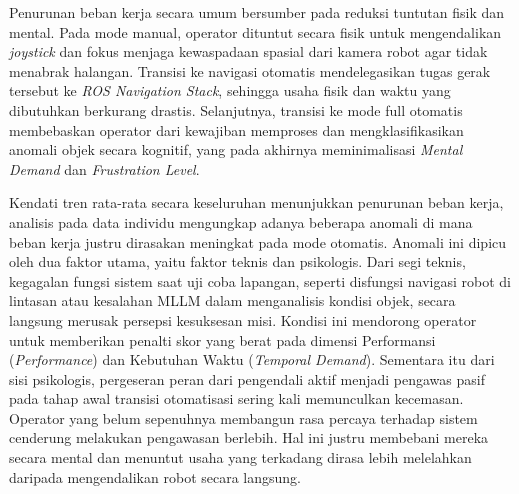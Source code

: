 Penurunan beban kerja secara umum bersumber pada reduksi tuntutan fisik dan mental. Pada mode manual, operator dituntut secara fisik untuk mengendalikan \textit{joystick} dan fokus menjaga kewaspadaan spasial dari kamera robot agar tidak menabrak halangan. Transisi ke navigasi otomatis mendelegasikan tugas gerak tersebut ke \textit{ROS Navigation Stack}, sehingga usaha fisik dan waktu yang dibutuhkan berkurang drastis. Selanjutnya, transisi ke mode full otomatis membebaskan operator dari kewajiban memproses dan mengklasifikasikan anomali objek secara kognitif, yang pada akhirnya meminimalisasi \textit{Mental Demand} dan \textit{Frustration Level}.

Kendati tren rata-rata secara keseluruhan menunjukkan penurunan beban kerja, analisis pada data individu mengungkap adanya beberapa anomali di mana beban kerja justru dirasakan meningkat pada mode otomatis. Anomali ini dipicu oleh dua faktor utama, yaitu faktor teknis dan psikologis. Dari segi teknis, kegagalan fungsi sistem saat uji coba lapangan, seperti disfungsi navigasi robot di lintasan atau kesalahan MLLM dalam menganalisis kondisi objek, secara langsung merusak persepsi kesuksesan misi. Kondisi ini mendorong operator untuk memberikan penalti skor yang berat pada dimensi Performansi (\textit{Performance}) dan Kebutuhan Waktu (\textit{Temporal Demand}). Sementara itu dari sisi psikologis, pergeseran peran dari pengendali aktif menjadi pengawas pasif pada tahap awal transisi otomatisasi sering kali memunculkan kecemasan. Operator yang belum sepenuhnya membangun rasa percaya terhadap sistem cenderung melakukan pengawasan berlebih. Hal ini justru membebani mereka secara mental dan menuntut usaha yang terkadang dirasa lebih melelahkan daripada mengendalikan robot secara langsung.


